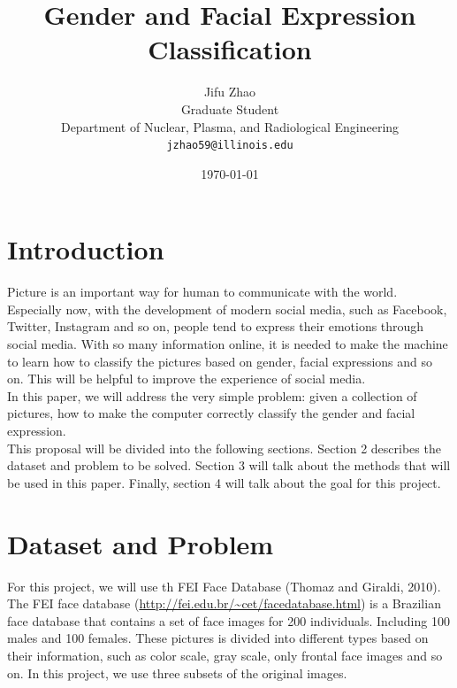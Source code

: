 \documentclass[11pt]{article}
\title{Gender and Facial Expression Classification}
\author{Jifu Zhao\\
  Graduate Student\\
  Department of Nuclear, Plasma, and Radiological Engineering \\
  {\tt jzhao59@illinois.edu} \\}
\date{\today}
\begin{document}
\maketitle

\section{Introduction}

Picture is an important way for human to communicate with the world. Especially now, with the development of modern social media, such as Facebook, Twitter, Instagram and so on, people tend to express their emotions through social media. With so many information online, it is needed to make the machine to learn how to classify the pictures based on gender, facial expressions and so on. This will be helpful to improve the experience of social media.\\

In this paper, we will address the very simple problem: given a collection of pictures, how to make the computer correctly classify the gender and facial expression.\\

This proposal will be divided into the following sections. Section 2 describes the dataset and problem to be solved. Section 3 will talk about the methods that will be used in this paper. Finally, section 4 will talk about the goal for this project.\\

\section{Dataset and Problem}

For this project, we will use th FEI Face Database (Thomaz and Giraldi, 2010). The FEI face database (\url{http://fei.edu.br/~cet/facedatabase.html}) is a Brazilian face database that contains a set of face images for 200 individuals. Including 100 males and 100 females. These pictures is divided into different types based on their information, such as color scale, gray scale, only frontal face images and so on. In this project, we use three subsets of the original images.\\
\end{document}
